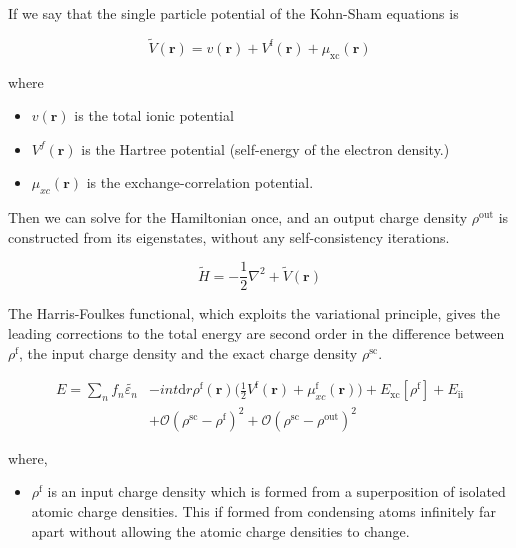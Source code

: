 \documentclass[11pt]{article}
\begin{document}
\begin{enumerate}
\begin{enumerate}
\begin{enumerate}
If we say that the single particle potential of the Kohn-Sham equations is 
\begin{LaTeX}
\[
\widetilde{V}(\mathbf{r}) = v(\mathbf{r}) + V^{\text{f}}(\mathbf{r}) + \mu_{\text{xc}}(\mathbf{r})
\]
\end{LaTeX}

where 
\begin{itemize}
\item \(v(\mathbf{r})\) is the total ionic potential
\item \(V^{f}(\mathbf{r})\) is the Hartree potential (self-energy of the electron density.)
\item \(\mu_{xc}(\mathbf{r})\) is the exchange-correlation potential.
\end{itemize}

Then we can solve for the Hamiltonian once, and an output charge density \(\rho^{\text{out}}\) is
constructed from its eigenstates, without any self-consistency iterations.  

\begin{LaTeX}
\[
\widetilde{H} = -\frac{1}{2} \nabla^{2} + \widetilde{V}(\mathbf{r})
\]
\end{LaTeX}



The Harris-Foulkes functional, which exploits the variational principle, gives 
the leading corrections to the total energy are second order in the difference 
between \(\rho^{\text{f}}\), the input charge density and the exact charge density \(\rho^{\text{sc}}\). 

\begin{LaTeX}
\begin{align}
E = \sum_{n} f_{n} \tilde{\varepsilon_{n}} &- int \text{d}r \rho^{\text{f}}(\mathbf{r})
               \big( \frac{1}{2} V^{\text{f}}(\mathbf{r}) + \mu_{xc}^{\text{f}}(\mathbf{r})  \big)
               + E_{\text{xc}}[\rho^{\text{f}}] + E_{\text{ii}}\\
               &+ \mathcal{O}(\rho^{\text{sc}} - \rho^{\text{f}})^2 + \mathcal{O}(\rho^{\text{sc}} - \rho^{\text{out}})^2
\end{align}
\end{LaTeX}

where,
\begin{itemize}
\item \(\rho^{\text{f}}\) is an input charge density which is formed
from a superposition of isolated atomic charge densities. This if formed
from condensing atoms infinitely far apart without allowing the atomic
charge densities to change.


\end{itemize}
\end{enumerate}
\end{enumerate}
\end{enumerate}
\end{document}
